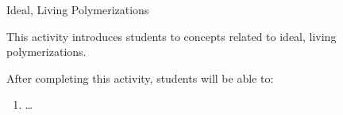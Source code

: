 %
%
%
%

\renewcommand{\figpath}{content/polymchem/livingpolyms/ideal-living-intro/figs}
\renewcommand{\labelbase}{ideal-living-intro}

\begin{activity}{Ideal, Living Polymerizations}

\begin{instructornotes}
	This activity introduces students to concepts related to ideal, living polymerizations.
	
	After completing this activity, students will be able to:
	\begin{enumerate}
		\item \dots
	\end{enumerate}
	

\end{instructornotes}
\end{activity}
